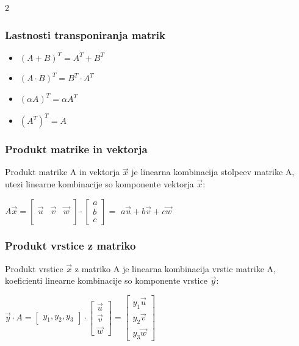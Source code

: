 \documentclass{article}
\begin{document}
\begin{multicols}{2}
	\subsubsection{Lastnosti transponiranja matrik}

	\begin{itemize}
		\item $(A + B)^{T} = A^{T} + B^{T}$
		\item $(A \cdot B)^{T} = B^{T} \cdot A^{T}$
		\item $(\alpha A)^{T} = \alpha A^{T}$
		\item $(A^{T})^{T} = A$
	\end{itemize}

	\subsubsection{Produkt matrike in vektorja}

	Produkt matrike A in vektorja $\vec{x}$ je
	linearna kombinacija stolpcev matrike A, utezi linearne
	kombinacije so komponente vektorja $\vec{x}$:
	\begin{center}
		$A \vec{x} =
			\begin{bmatrix}
				        &         &         \\
				\vec{u} & \vec{v} & \vec{w} \\
				        &         &         \\
			\end{bmatrix}
			\cdot
			\begin{bmatrix}
				a \\
				b \\
				c
			\end{bmatrix} =$
		$a\vec{u} + b\vec{v} + c\vec{w}$
	\end{center}

	\subsubsection{Produkt vrstice z matriko}

	Produkt vrstice $\vec{x}$ z matriko A je
	linearna kombinacija vrstic matrike A, koeficienti linearne
	kombinacije so komponente vrstice $\vec{y}$:
	\begin{center}
		$\vec{y} \cdot A =
			\begin{bmatrix}
				y_{1}, y_{2}, y_{3}
			\end{bmatrix} \cdot
			\begin{bmatrix}
				\vec{u} \\
				\vec{v} \\
				\vec{w}
			\end{bmatrix} =
			\begin{bmatrix}
				y_{1}\vec{u} \\
				y_{2}\vec{v} \\
				y_{3}\vec{w}
			\end{bmatrix}
		$
	\end{center}


\end{multicols}
\end{document}
